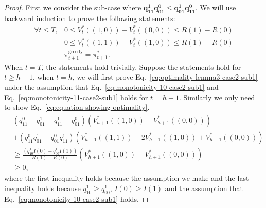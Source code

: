 \begin{proof}
First we consider the sub-case where $\boxed{\bm{q^1_{11}q^0_{01}\leq q^1_{01}q^0_{11}}}$. We will use backward induction to prove the following statements:
\begin{align}
    \forall t\leq T, &0\leq V_t^*\left((1,0)\right)-V_t^*((0,0))\leq R(1)-R(0)\label{eq:monotonicity-10-case2-sub1}\\
    &0\leq V_t^*\left((1,1)\right)-V_t^*((1,0))\leq R(1)-R(0)\label{eq:monotonicity-11-case2-sub1}\\
    &\pi_{t+1}^{\text{greedy}}=\pi_{t+1}^*.\label{eq:optimality-lemma3-case2-sub1}
\end{align}
When $t=T$, the statements hold trivially. Suppose the statements hold for $t\geq h+1$, when $t=h$, we will first prove Eq.~\eqref{eq:optimality-lemma3-case2-sub1} under the assumption that Eq.~\eqref{eq:monotonicity-10-case2-sub1} and Eq.~\eqref{eq:monotonicity-11-case2-sub1} holds for $t=h+1$. Similarly we only need to show Eq.~\eqref{eq:equation-showing-optimality}. 
\begin{align*}
    &\left(q^0_{11}+q^1_{01}-q^1_{11}-q^0_{01}\right)\left(V_{h+1}^*\left((1,0)\right)-V_{h+1}^*\left((0,0)\right)\right)\\&+\left(q^0_{11}q^1_{01}-q^0_{01}q^1_{11}\right)\left(V_{h+1}^*\left((1,1)\right)-2V_{h+1}^*\left((1,0)\right)+V_{h+1}^*\left((0,0)\right)\right)\\
    &\geq \frac{\left(q^1_{10}I(0)-q^1_{00}I(1)\right)}{R(1)-R(0)}\left(V_{h+1}^*\left((1,0)\right)-V_{h+1}^*\left((0,0)\right)\right)\\
    &\geq 0,
\end{align*}
where the first inequality holds because the assumption we make and the last inequality holds because $q^1_{10}\geq q^1_{00}$, $I(0)\geq I(1)$ and the assumption that Eq.~\eqref{eq:monotonicity-10-case2-sub1} holds.


\end{proof}
